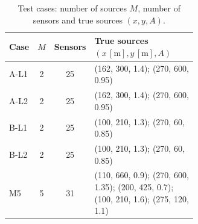 \begin{table}[htbp]
\centering
\caption{Test cases: number of sources $M$, number of sensors and true sources $(x, y, A)$.}
\label{tab:table_cases}
\footnotesize
\begin{tabular}{lccp{0.62\linewidth}}
\toprule
Case & $M$ & Sensors & True sources $(x\,[\mathrm{m}], y\,[\mathrm{m}], A)$ \\
\midrule
A-L1 & 2 & 25 & (162, 300, 1.4); (270, 600, 0.95) \\
A-L2 & 2 & 25 & (162, 300, 1.4); (270, 600, 0.95) \\
B-L1 & 2 & 25 & (100, 210, 1.3); (270, 60, 0.85) \\
B-L2 & 2 & 25 & (100, 210, 1.3); (270, 60, 0.85) \\
M5 & 5 & 31 & (110, 660, 0.9); (270, 600, 1.35); (200, 425, 0.7); (100, 210, 1.6); (275, 120, 1.1) \\
\bottomrule
\end{tabular}
\end{table}

